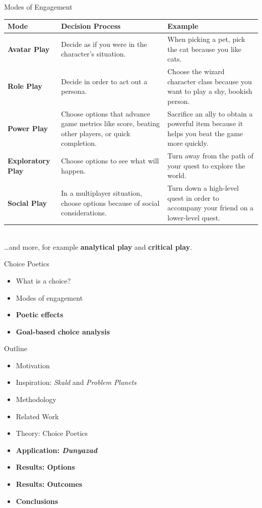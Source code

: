 \documentclass[xcolor=x11names]{beamer}
\def\dunyazad/{\textit{Dunyazad}}
\def\skald/{\textit{Skald}}
\def\problemplanets/{\textit{Problem Planets}}
\begin{document}
\begin{frame}{Modes of Engagement}
\centering
\renewcommand*{\arraystretch}{1.5}
\scriptsize
\begin{tabular}{p{6em}p{12em}p{13em}}
\toprule
\textbf{Mode} & \textbf{Decision Process} & \textbf{Example} \\
\midrule
\textbf{Avatar Play} & Decide as if you were in the character's situation. & When picking a pet, pick the cat because you like cats. \\
\textbf{Role Play} & Decide in order to act out a persona. & Choose the wizard character class because you want to play a shy, bookish person. \\
\textbf{Power Play} & Choose options that advance game metrics like score, beating other players, or quick completion. & Sacrifice an ally to obtain a powerful item because it helps you beat the game more quickly. \\
\textbf{Exploratory Play} & Choose options to see what will happen. & Turn away from the path of your quest to explore the world. \\
\textbf{Social Play} & In a multiplayer situation, choose options because of social considerations. & Turn down a high-level quest in order to accompany your friend on a lower-level quest. \\
\bottomrule
\end{tabular} \\ \vspace{1ex}
\ldots and more, for example \textbf{analytical play} and \textbf{critical play}.
\end{frame}

\begin{frame}{Choice Poetics}
  \begin{itemize}\addtolength{\itemsep}{0.5\baselineskip}
      \item What is a choice?
      \item Modes of engagement
      \item \textbf{Poetic effects}
      \item \textbf{Goal-based choice analysis}
  \end{itemize}
\end{frame}

\begin{frame}{Outline}
  \begin{itemize}
    \item Motivation
    \item Inspiration: \skald/ and \problemplanets/
    \item Methodology
    \item Related Work
    \item Theory: Choice Poetics
    \item \textbf{Application: \dunyazad/}
    \item \textbf{Results: Options}
    \item \textbf{Results: Outcomes}
    \item \textbf{Conclusions}
  \end{itemize}
\end{frame}
\end{document}
